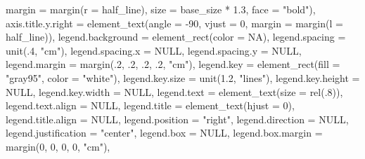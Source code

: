 \documentclass[
  letterpaper,
]{scrbook}
\newenvironment{Shaded}{\begin{snugshade}}{\end{snugshade}}
\newcommand{\AttributeTok}[1]{\textcolor[rgb]{0.40,0.45,0.13}{#1}}
\newcommand{\ConstantTok}[1]{\textcolor[rgb]{0.56,0.35,0.01}{#1}}
\newcommand{\DecValTok}[1]{\textcolor[rgb]{0.68,0.00,0.00}{#1}}
\newcommand{\FloatTok}[1]{\textcolor[rgb]{0.68,0.00,0.00}{#1}}
\newcommand{\FunctionTok}[1]{\textcolor[rgb]{0.28,0.35,0.67}{#1}}
\newcommand{\NormalTok}[1]{\textcolor[rgb]{0.00,0.23,0.31}{#1}}
\newcommand{\SpecialCharTok}[1]{\textcolor[rgb]{0.37,0.37,0.37}{#1}}
\newcommand{\StringTok}[1]{\textcolor[rgb]{0.13,0.47,0.30}{#1}}
\begin{document}
\begin{Shaded}
\begin{Highlighting}[]
                                \AttributeTok{margin =} \FunctionTok{margin}\NormalTok{(}\AttributeTok{r =}\NormalTok{ half\_line),}
                                \AttributeTok{size =}\NormalTok{ base\_size }\SpecialCharTok{*} \FloatTok{1.3}\NormalTok{, }\AttributeTok{face =} \StringTok{"bold"}\NormalTok{),}
    \AttributeTok{axis.title.y.right =} \FunctionTok{element\_text}\NormalTok{(}\AttributeTok{angle =} \SpecialCharTok{{-}}\DecValTok{90}\NormalTok{, }\AttributeTok{vjust =} \DecValTok{0}\NormalTok{,}
                                      \AttributeTok{margin =} \FunctionTok{margin}\NormalTok{(}\AttributeTok{l =}\NormalTok{ half\_line)),}
    \AttributeTok{legend.background =} \FunctionTok{element\_rect}\NormalTok{(}\AttributeTok{color =} \ConstantTok{NA}\NormalTok{),}
    \AttributeTok{legend.spacing =} \FunctionTok{unit}\NormalTok{(.}\DecValTok{4}\NormalTok{, }\StringTok{"cm"}\NormalTok{),}
    \AttributeTok{legend.spacing.x =} \ConstantTok{NULL}\NormalTok{,}
    \AttributeTok{legend.spacing.y =} \ConstantTok{NULL}\NormalTok{,}
    \AttributeTok{legend.margin =} \FunctionTok{margin}\NormalTok{(.}\DecValTok{2}\NormalTok{, .}\DecValTok{2}\NormalTok{, .}\DecValTok{2}\NormalTok{, .}\DecValTok{2}\NormalTok{, }\StringTok{"cm"}\NormalTok{),}
    \AttributeTok{legend.key =} \FunctionTok{element\_rect}\NormalTok{(}\AttributeTok{fill =} \StringTok{"gray95"}\NormalTok{, }\AttributeTok{color =} \StringTok{"white"}\NormalTok{),}
    \AttributeTok{legend.key.size =} \FunctionTok{unit}\NormalTok{(}\FloatTok{1.2}\NormalTok{, }\StringTok{"lines"}\NormalTok{),}
    \AttributeTok{legend.key.height =} \ConstantTok{NULL}\NormalTok{,}
    \AttributeTok{legend.key.width =} \ConstantTok{NULL}\NormalTok{,}
    \AttributeTok{legend.text =} \FunctionTok{element\_text}\NormalTok{(}\AttributeTok{size =} \FunctionTok{rel}\NormalTok{(.}\DecValTok{8}\NormalTok{)),}
    \AttributeTok{legend.text.align =} \ConstantTok{NULL}\NormalTok{,}
    \AttributeTok{legend.title =} \FunctionTok{element\_text}\NormalTok{(}\AttributeTok{hjust =} \DecValTok{0}\NormalTok{),}
    \AttributeTok{legend.title.align =} \ConstantTok{NULL}\NormalTok{,}
    \AttributeTok{legend.position =} \StringTok{"right"}\NormalTok{,}
    \AttributeTok{legend.direction =} \ConstantTok{NULL}\NormalTok{,}
    \AttributeTok{legend.justification =} \StringTok{"center"}\NormalTok{,}
    \AttributeTok{legend.box =} \ConstantTok{NULL}\NormalTok{,}
    \AttributeTok{legend.box.margin =} \FunctionTok{margin}\NormalTok{(}\DecValTok{0}\NormalTok{, }\DecValTok{0}\NormalTok{, }\DecValTok{0}\NormalTok{, }\DecValTok{0}\NormalTok{, }\StringTok{"cm"}\NormalTok{),}

\end{Highlighting}
\end{Shaded}
\end{document}
